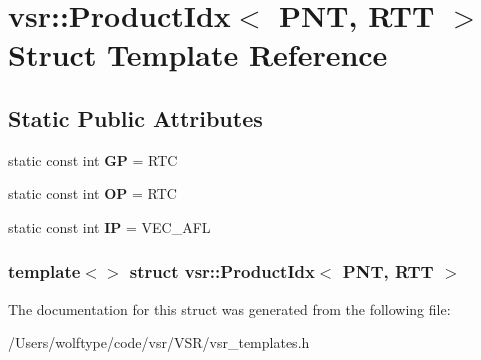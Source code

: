 \hypertarget{structvsr_1_1_product_idx_3_01_p_n_t_00_01_r_t_t_01_4}{\section{vsr\-:\-:Product\-Idx$<$ P\-N\-T, R\-T\-T $>$ Struct Template Reference}
\label{structvsr_1_1_product_idx_3_01_p_n_t_00_01_r_t_t_01_4}
}
\subsection*{Static Public Attributes}
\begin{DoxyCompactItemize}
\item 
\hypertarget{structvsr_1_1_product_idx_3_01_p_n_t_00_01_r_t_t_01_4_a76e2834a5fe605a91615297f134d476e}{static const int {\bfseries G\-P} = R\-T\-C}\label{structvsr_1_1_product_idx_3_01_p_n_t_00_01_r_t_t_01_4_a76e2834a5fe605a91615297f134d476e}

\item 
\hypertarget{structvsr_1_1_product_idx_3_01_p_n_t_00_01_r_t_t_01_4_a879ddabd5d8566fbfcd70b45bcb358ea}{static const int {\bfseries O\-P} = R\-T\-C}\label{structvsr_1_1_product_idx_3_01_p_n_t_00_01_r_t_t_01_4_a879ddabd5d8566fbfcd70b45bcb358ea}

\item 
\hypertarget{structvsr_1_1_product_idx_3_01_p_n_t_00_01_r_t_t_01_4_a179fb92f0af0096aa438b33034a0165a}{static const int {\bfseries I\-P} = V\-E\-C\-\_\-\-A\-F\-L}\label{structvsr_1_1_product_idx_3_01_p_n_t_00_01_r_t_t_01_4_a179fb92f0af0096aa438b33034a0165a}

\end{DoxyCompactItemize}
\subsubsection*{template$<$$>$ struct vsr\-::\-Product\-Idx$<$ P\-N\-T, R\-T\-T $>$}



The documentation for this struct was generated from the following file\-:\begin{DoxyCompactItemize}
\item 
/\-Users/wolftype/code/vsr/\-V\-S\-R/vsr\-\_\-templates.\-h\end{DoxyCompactItemize}
